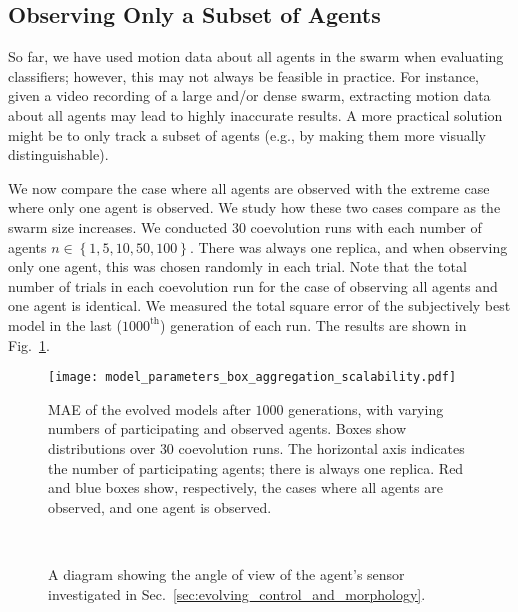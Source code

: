 \subsection{Observing Only a Subset of Agents}\label{sec:evolving_subset_of_agents_swarm_simulation}
So far, we have used motion data about all agents in the swarm when evaluating classifiers; however, this may not always be feasible in practice. For instance, given a video recording of a large and/or dense swarm, extracting motion data about all agents may lead to highly inaccurate results. A more practical solution might be to only track a subset of agents (e.g., by making them more visually distinguishable).

We now compare the case where all agents are observed with the extreme case where only one agent is observed. We study how these two cases compare as the swarm size increases. We conducted $30$ coevolution runs with each number of agents $n\in\left\{1, 5, 10, 50, 100\right\}$. There was always one replica, and when observing only one agent, this was chosen randomly in each trial. Note that the total number of trials in each coevolution run for the case of observing all agents and one agent is identical. We measured the total square error of the subjectively best model in the last ($1000^\textrm{th}$) generation of each run. The results are shown in Fig.~\ref{fig:model_parameters_box_aggregation_scalability}.
\begin{figure}[!t]%
	\centering
	\texttt{[image: model\_parameters\_box\_aggregation\_scalability.pdf]}
	\caption{MAE of the evolved models after $1000$ generations, with varying numbers of participating and observed agents. Boxes show distributions over $30$ coevolution runs. The horizontal axis indicates the number of participating agents; there is always one replica. Red and blue boxes show, respectively, the cases where all agents are observed, and one agent is observed. }
	\label{fig:model_parameters_box_aggregation_scalability}
\end{figure}

\begin{figure}[!t]%
	\centering
		\subfloat[(a) \label{fig:Angle_I=0}]{%
			\texttt{[image: Angle\_I=0.pdf]}
		}\\
		\subfloat[(b) \label{fig:Angle_I=1}]{%
			\texttt{[image: Angle\_I=1.pdf]}
		}
		\caption{A diagram showing the angle of view of the agent's sensor investigated in Sec.~\ref{sec:evolving_control_and_morphology}.}
		\label{fig:Angle_I}
\end{figure}

